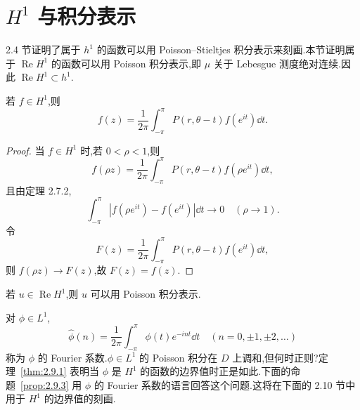 \section{\texorpdfstring{$H^1$ 与积分表示}{H1 与积分表示}}\label{sec:2.9}

2.4 节证明了属于 $h^{1}$ 的函数可以用 Poisson--Stieltjes 积分表示来刻画.本节证明属于 $\operatorname{Re}H^{1}$ 的函数可以用 Poisson 积分表示,即 $\mu$ 关于 Lebesgue 测度绝对连续.因此 $\operatorname{Re}H^{1} \subset h^{1}$.

\begin{theorem}\label{thm:2.9.1}
若 $f \in H^{1}$,则
\begin{equation*}
f(z) = \frac{1}{2\pi}\int_{-\pi}^{\pi}P(r, \theta - t)f(e^{it})\dd t.
\end{equation*}
\end{theorem}

\begin{proof}
当 $f \in H^{1}$ 时,若 $0 < \rho < 1$,则
\begin{equation*}
f(\rho z) = \frac{1}{2\pi}\int_{-\pi}^{\pi}P(r, \theta - t)f(\rho e^{it})\dd t,
\end{equation*}
且由定理 2.7.2,
\begin{equation*}
\int_{-\pi}^{\pi}|f(\rho e^{it}) - f(e^{it})|\dd t \rightarrow 0 \quad (\rho \rightarrow 1).
\end{equation*}
令
\begin{equation*}
F(z) = \frac{1}{2\pi}\int_{-\pi}^{\pi}P(r, \theta - t)f(e^{it})\dd t,
\end{equation*}
则 $f(\rho z) \to F(z)$,故 $F(z) = f(z)$.
\end{proof}

\begin{corollary}\label{cor:2.9.2}
若 $u \in \operatorname{Re}H^{1}$,则 $u$ 可以用 Poisson 积分表示.
\end{corollary}

对 $\phi \in L^{1}$,
\begin{equation*}
\hat{\phi}(n) = \frac{1}{2\pi}\int_{-\pi}^{\pi}\phi(t)e^{-int}\dd t \quad (n = 0, \pm 1, \pm 2, \ldots)
\end{equation*}
称为 $\phi$ 的 Fourier 系数.$\phi \in L^{1}$ 的 Poisson 积分在 $D$ 上调和,但何时正则?定理~\ref{thm:2.9.1} 表明当 $\phi$ 是 $H^{1}$ 的函数的边界值时正是如此.下面的命题~\ref{prop:2.9.3} 用 $\phi$ 的 Fourier 系数的语言回答这个问题.这将在下面的 2.10 节中用于 $H^{1}$ 的边界值的刻画.


